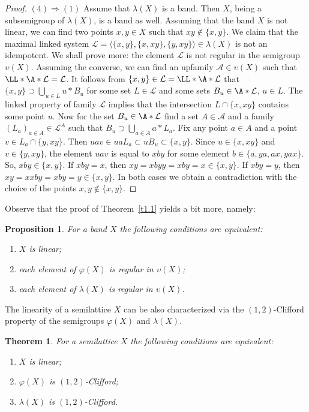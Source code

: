\documentclass{amsart}
\newtheorem{theorem}[lem]{Theorem}
\newtheorem{proposition}[lem]{Proposition}
\theoremstyle{definition}
\begin{document}
\begin{proof}
$(4){\Rightarrow}(1)$ Assume that $\lambda(X)$ is a band. Then $X$, being a subsemigroup of $\lambda(X)$, is a band as well. Assuming that the band $X$ is not linear, we can find two points $x,y\in X$ such that $xy\notin\{x,y\}$.
We claim that the maximal linked system ${\mathcal L}={\langle}\{x,y\},\{x,xy\},\{y,xy\}{\rangle}\in\lambda(X)$ is not an idempotent. We shall prove more: the element ${\mathcal L}$ is not regular in the semigroup ${\upsilon}(X)$.
Assuming the converse, we can find an upfamily ${\mathcal A}\in{\upsilon}(X)$ such that $\LL*\A*{\mathcal L}={\mathcal L}$. It follows from $\{x,y\}\in{\mathcal L}=\LL*\A*{\mathcal L}$ that $\{x,y\}\supset \bigcup_{u\in L}u*B_u$ for some set $L\in{\mathcal L}$ and some sets $B_u\in\A*{\mathcal L}$, $u\in L$. The linked property of family ${\mathcal L}$ implies that the intersection $L\cap\{x,xy\}$ contains some point $u$. Now for the set $B_u\in\A*{\mathcal L}$ find a set $A\in{\mathcal A}$ and a family $(L_a)_{a\in A}\in{\mathcal L}^A$ such that $B_u\supset\bigcup_{a\in A}a*L_a$. Fix any point $a\in A$ and a point $v\in L_a\cap\{y,xy\}$. Then $uav\in uaL_a\subset uB_u\subset \{x,y\}$.
Since $u\in\{x,xy\}$ and $v\in \{y,xy\}$, the element $uav$ is equal to $xby$ for some element $b\in\{a,ya,ax,yax\}$. So, $xby\in\{x,y\}$. If $xby=x$, then $xy=xbyy=xby=x\in\{x,y\}$. If $xby=y$, then $xy=xxby=xby=y\in\{x,y\}$. In both cases we obtain a contradiction with the choice of the points $x,y\notin\{x,y\}$.
\end{proof}

 Observe that the proof of Theorem~\ref{t1.1} yields a bit more, namely:

\begin{proposition} For a band $X$ the following conditions are equivalent:
\begin{enumerate}
\item $X$ is linear;
\item each element of $\varphi(X)$ is regular in ${\upsilon}(X)$;
\item each element of $\lambda(X)$ is regular in ${\upsilon}(X)$.
\end{enumerate}
\end{proposition}

The linearity of a semilattice $X$ can be also characterized via the $(1,2)$-Clifford property of the semigroups $\varphi(X)$ and $\lambda(X)$.

\begin{theorem}\label{t(1,2)} For a semilattice $X$ the following conditions are equivalent:
\begin{enumerate}
\item $X$ is linear;
\item $\varphi(X)$ is $(1,2)$-Clifford;
\item $\lambda(X)$ is $(1,2)$-Clifford.
\end{enumerate}
\end{theorem}
\end{document}
